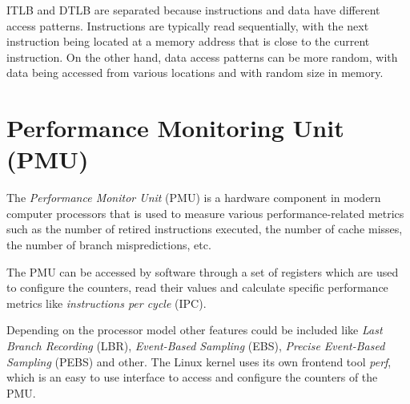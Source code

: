 ITLB and DTLB are separated because instructions and data have different access patterns. Instructions are typically read sequentially, with the next instruction being located at a memory address that is close to the current instruction. On the other hand, data access patterns can be more random, with data being accessed from various locations and with random size in memory. \cite[p. 4-5]{quantivapproach-ApL}

\section{Performance Monitoring Unit (PMU)}\label{section:pmu}

The \textit{Performance Monitor Unit} (PMU) is a hardware component in modern computer processors that is used to measure various performance-related metrics such as the number of retired instructions executed, the number of cache misses, the number of branch mispredictions, etc. \cite[p. 156]{brendan} \cite{pmushort}

The PMU can be accessed by software through a set of registers which are used to configure the counters, read their values and calculate specific performance metrics like \textit{instructions per cycle} (IPC). \cite{how-counters-work} \cite[p. 681]{brendan} \cite{pmushort}

Depending on the processor model other features could be included like \textit{Last Branch Recording} (LBR), \textit{Event-Based Sampling} (EBS), \textit{Precise Event-Based Sampling} (PEBS) and other. \cite[p. 43]{patmc} The Linux kernel uses its own frontend tool \textit{perf}, which is an easy to use interface to access and configure the counters of the PMU. \cite[p. 671]{brendan}